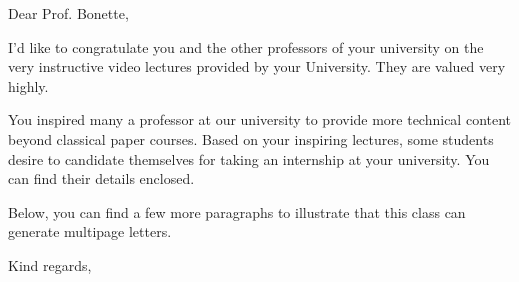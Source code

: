 \documentclass[a4paper]{uantwerpenletter}
\date{January 3, 2016}
\begin{document}
  \maketitle

  \opening{Dear Prof. Bonette,}

  I'd like to congratulate you and the other professors of your
  university on the very instructive video lectures
  provided by your University. They are valued very
  highly.

  You inspired many a professor at our university to provide more
  technical content beyond classical paper courses.
  Based on your inspiring lectures, some students desire to candidate
  themselves for taking an internship at your university. You can find
  their details enclosed.

  Below, you can find a few more paragraphs to illustrate that this
  class can generate multipage letters.

  \lipsum[1-3]

  \closing{Kind regards,}
\end{document}
